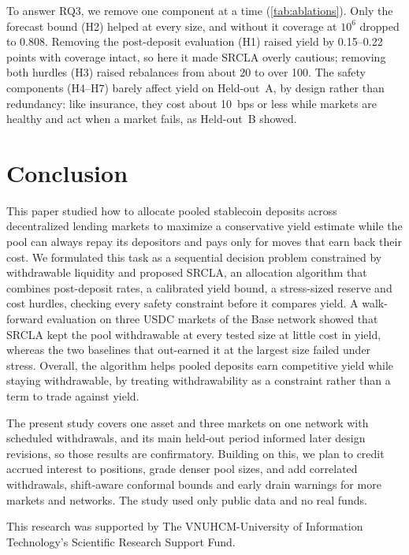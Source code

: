 \documentclass[sigconf]{acmart}
\begin{document}
To answer RQ3, we remove one component at a time (\cref{tab:ablations}). Only the forecast bound (H2) helped at every size, and without it coverage at $10^6$ dropped to 0.808. Removing the post-deposit evaluation (H1) raised yield by 0.15--0.22 points with coverage intact, so here it made SRCLA overly cautious; removing both hurdles (H3) raised rebalances from about 20 to over 100. The safety components (H4--H7) barely affect yield on Held-out~A, by design rather than redundancy: like insurance, they cost about 10~bps or less while markets are healthy and act when a market fails, as Held-out~B showed.

\section{Conclusion}
\label{sec:conclusion}

This paper studied how to allocate pooled stablecoin deposits across decentralized lending markets to maximize a conservative yield estimate while the pool can always repay its depositors and pays only for moves that earn back their cost. We formulated this task as a sequential decision problem constrained by withdrawable liquidity and proposed SRCLA, an allocation algorithm that combines post-deposit rates, a calibrated yield bound, a stress-sized reserve and cost hurdles, checking every safety constraint before it compares yield. A walk-forward evaluation on three USDC markets of the Base network showed that SRCLA kept the pool withdrawable at every tested size at little cost in yield, whereas the two baselines that out-earned it at the largest size failed under stress. Overall, the algorithm helps pooled deposits earn competitive yield while staying withdrawable, by treating withdrawability as a constraint rather than a term to trade against yield.

The present study covers one asset and three markets on one network with scheduled withdrawals, and its main held-out period informed later design revisions, so those results are confirmatory. Building on this, we plan to credit accrued interest to positions, grade denser pool sizes, and add correlated withdrawals, shift-aware conformal bounds and early drain warnings for more markets and networks. The study used only public data and no real funds.

\begin{acks}
This research was supported by The VNUHCM-University of Information Technology's Scientific Research Support Fund.
\end{acks}



\end{document}
